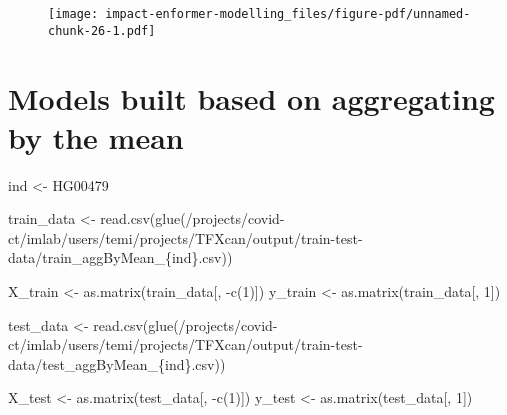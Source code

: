 \documentclass[
  letterpaper,
  DIV=11,
  numbers=noendperiod]{scrartcl}
\newenvironment{Shaded}{\begin{snugshade}}{\end{snugshade}}
\newcommand{\DecValTok}[1]{\textcolor[rgb]{0.68,0.00,0.00}{#1}}
\newcommand{\FunctionTok}[1]{\textcolor[rgb]{0.28,0.35,0.67}{#1}}
\newcommand{\NormalTok}[1]{\textcolor[rgb]{0.00,0.23,0.31}{#1}}
\newcommand{\OtherTok}[1]{\textcolor[rgb]{0.00,0.23,0.31}{#1}}
\newcommand{\SpecialCharTok}[1]{\textcolor[rgb]{0.37,0.37,0.37}{#1}}
\newcommand{\StringTok}[1]{\textcolor[rgb]{0.13,0.47,0.30}{#1}}
\begin{document}
\begin{figure}[H]

{\centering \texttt{[image: impact-enformer-modelling\_files/figure-pdf/unnamed-chunk-26-1.pdf]}

}

\end{figure}

\newpage

\hypertarget{models-built-based-on-aggregating-by-the-mean}{%
\section{Models built based on aggregating by the
mean}\label{models-built-based-on-aggregating-by-the-mean}}

\begin{Shaded}
\begin{Highlighting}[]
\NormalTok{ind }\OtherTok{\textless{}{-}} \StringTok{\textquotesingle{}HG00479\textquotesingle{}}
\end{Highlighting}
\end{Shaded}

\begin{Shaded}
\begin{Highlighting}[]
\NormalTok{train\_data }\OtherTok{\textless{}{-}} \FunctionTok{read.csv}\NormalTok{(}\FunctionTok{glue}\NormalTok{(}\StringTok{\textquotesingle{}/projects/covid{-}ct/imlab/users/temi/projects/TFXcan/output/train{-}test{-}data/train\_aggByMean\_\{ind\}.csv\textquotesingle{}}\NormalTok{))}

\NormalTok{X\_train }\OtherTok{\textless{}{-}} \FunctionTok{as.matrix}\NormalTok{(train\_data[, }\SpecialCharTok{{-}}\FunctionTok{c}\NormalTok{(}\DecValTok{1}\NormalTok{)])}
\NormalTok{y\_train }\OtherTok{\textless{}{-}} \FunctionTok{as.matrix}\NormalTok{(train\_data[, }\DecValTok{1}\NormalTok{])}

\NormalTok{test\_data }\OtherTok{\textless{}{-}} \FunctionTok{read.csv}\NormalTok{(}\FunctionTok{glue}\NormalTok{(}\StringTok{\textquotesingle{}/projects/covid{-}ct/imlab/users/temi/projects/TFXcan/output/train{-}test{-}data/test\_aggByMean\_\{ind\}.csv\textquotesingle{}}\NormalTok{))}

\NormalTok{X\_test }\OtherTok{\textless{}{-}} \FunctionTok{as.matrix}\NormalTok{(test\_data[, }\SpecialCharTok{{-}}\FunctionTok{c}\NormalTok{(}\DecValTok{1}\NormalTok{)])}
\NormalTok{y\_test }\OtherTok{\textless{}{-}} \FunctionTok{as.matrix}\NormalTok{(test\_data[, }\DecValTok{1}\NormalTok{])}
\end{Highlighting}
\end{Shaded}
\end{document}
